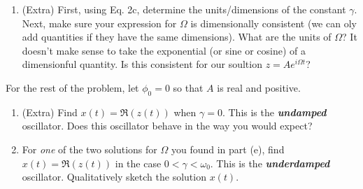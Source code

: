 \documentclass[10pt]{article}
\begin{document}
	 \begin{enumerate}[label=\alph*), resume]
	 	\item (Extra) First, using Eq. 2c, determine the units/dimensions of the constant $\gamma$. Next, make
			sure your expression for $\Omega$ is dimensionally consistent (we can oly add quantities if they 
			have the same dimensions). What are the units of $\Omega$? It doesn't make sense to take the 
			exponential (or sine or cosine) of a dimensionful quantity. Is this consistent for our soultion 
			$z = Ae^{i \Omega t}$?
	 \end{enumerate}
	 For the rest of the problem, let $\phi_0 = 0$ so that $A$ is real and positive.
	 \begin{enumerate}[label=\alph*), resume]
		 \item (Extra) Find $x(t) = \Re(z(t))$ when $\gamma = 0$. This is the \textbf{\textit{undamped}} 
			 oscillator. Does this oscillator behave in the way you would expect?
		 \item For \textit{one} of the two solutions for $\Omega$ you found in part (e), find $x(t) = \Re(z(t))$
			 in the case $0 < \gamma < \omega_0$. This is the \textbf{\textit{underdamped}} oscillator. 
			 Qualitatively sketch the solution $x(t)$.


\end{enumerate}
\end{document}
